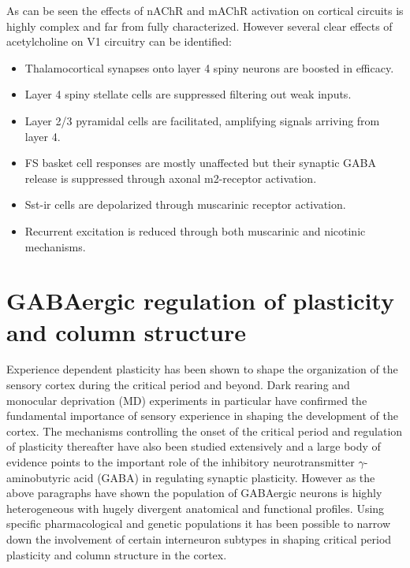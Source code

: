 As can be seen the effects of nAChR and mAChR activation on cortical
circuits is highly complex and far from fully characterized. However
several clear effects of acetylcholine on V1 circuitry can be
identified:

\begin{itemize}
  \item Thalamocortical synapses onto layer 4 spiny neurons are
    boosted in efficacy.
  \item Layer 4 spiny stellate cells are suppressed filtering out weak
    inputs.
  \item Layer 2/3 pyramidal cells are facilitated, amplifying signals
    arriving from layer 4.
  \item FS basket cell responses are mostly unaffected but their
    synaptic GABA release is suppressed through axonal m2-receptor
    activation.
  \item Sst-ir cells are depolarized through muscarinic receptor
    activation.
  \item Recurrent excitation is reduced through both muscarinic and
    nicotinic mechanisms.
\end{itemize}

\section{GABAergic regulation of plasticity and column structure}

Experience dependent plasticity has been shown to shape the
organization of the sensory cortex during the critical period and
beyond. Dark rearing \citep{Fregnac1978} and monocular deprivation
(MD) experiments \citep{Shatz1978} in particular have confirmed the
fundamental importance of sensory experience in shaping the
development of the cortex. The mechanisms controlling the onset of the
critical period and regulation of plasticity thereafter have also been
studied extensively and a large body of evidence points to the
important role of the inhibitory neurotransmitter
$\gamma$-aminobutyric acid (GABA) in regulating synaptic
plasticity. However as the above paragraphs have shown the population
of GABAergic neurons is highly heterogeneous with hugely divergent
anatomical and functional profiles. Using specific pharmacological and
genetic populations it has been possible to narrow down the
involvement of certain interneuron subtypes in shaping critical period
plasticity and column structure in the cortex.

